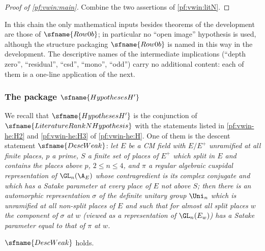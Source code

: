 \begin{proof}[Proof of \cref{pf:vwin:main}]
Combine the two assertions of \cref{pf:vwin:litN}.
\end{proof}

\begin{remark}\label{pf:vwin:rem-names}
In this chain the only mathematical inputs besides theorems of the development are those of $\sfname{Row0b}$; in
particular no ``open image'' hypothesis is used, although the structure packaging $\sfname{Row0b}$ is named in this way
in the development. The descriptive names of the intermediate implications (``depth zero'', ``residual'', ``csd'',
``mono'', ``odd'') carry no additional content: each of them is a one-line application of the next.
\end{remark}

\subsubsection{The package \texorpdfstring{$\sfname{HypothesesH'}$}{HypothesesH'}}

We recall that $\sfname{HypothesesH'}$ is the conjunction of $\sfname{LiteratureRankNHypothesis}$ with the statements
listed in \ref{pf:vwin-he:H2} and \ref{pf:vwin-he:H3} of \cref{pf:vwin-he:H}. One of them is the descent statement
$\sfname{DescWeak}$: \emph{let $E$ be a CM field with $E/E^+$ unramified at all finite places, $p$ a prime, $S$ a finite set
of places of $E^+$ which split in $E$ and contains the places above $p$, $2\le n\le4$, and $\pi$ a regular algebraic
cuspidal representation of $\GL_n(\A_E)$ whose contragredient is its complex conjugate and which has a Satake parameter at
every place of $E$ not above $S$; then there is an automorphic representation $\sigma$ of the definite unitary group
$\Uni_n$ which is unramified at all non-split places of $E$ and such that for almost all split places $w$ the component of
$\sigma$ at $w$ (viewed as a representation of $\GL_n(E_w)$) has a Satake parameter equal to that of $\pi$ at $w$.}

\begin{proposition}\label{pf:vwin:descweak}
$\sfname{DescWeak}$ holds.
\end{proposition}

